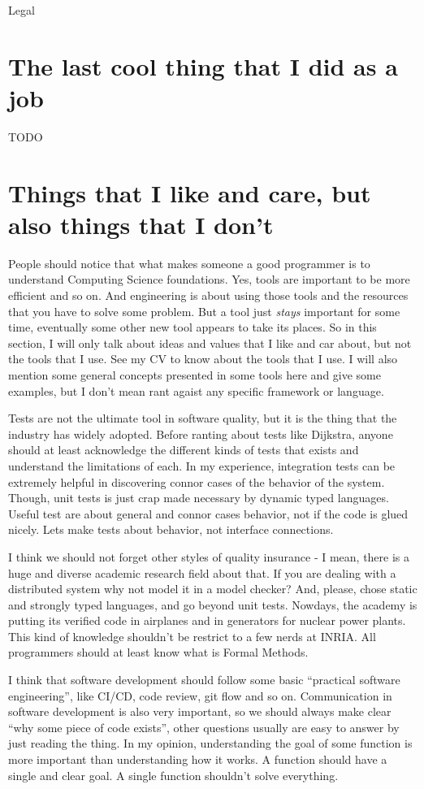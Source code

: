 \documentclass[11pt,a4paper,sans]{moderncv}
\begin{document}
Legal

\section{The last cool thing that I did as a job}
TODO

\section{Things that I like and care, but also things that I don't}
People should notice that what makes someone a good programmer is to understand Computing Science foundations.
Yes, tools are important to be more efficient and
so on. And engineering is about using those tools and the resources that you
have to solve some problem. But a tool just \textit{stays} important for some
time, eventually some other new tool appears to take its places. So in this
section, I will only talk about ideas and values that I like and car about, but
not the tools that I use. See my CV to know about the tools that I use. I will
also mention some general concepts presented in some tools here and give some
examples, but I don't mean rant agaist any specific framework or language.

Tests are not the ultimate tool in software
quality, but it is the thing that the industry has widely adopted.
Before ranting about tests like Dijkstra, anyone should at least acknowledge
the different kinds of tests that exists and understand the limitations of each.
In my experience, integration tests can be extremely helpful in discovering
connor cases of the behavior of the system. Though, unit tests is just crap
made necessary by dynamic typed languages. Useful test are about general
and connor cases behavior, not if the code is glued nicely. Lets make tests
about behavior, not interface connections.

I think we should not forget other styles of quality insurance - I mean, there
is a huge and diverse academic research field about that. If you are dealing
with a distributed system why not model it in a model checker? And, please,
chose static and strongly typed languages, and go beyond unit tests. Nowdays,
the academy is putting its verified code in airplanes and in generators for
nuclear power plants. This kind of knowledge shouldn't be restrict to a few nerds
at INRIA. All programmers should at least know what is Formal Methods.

I think that software development should follow some basic ``practical
software engineering'', like CI/CD, code review, git flow and so on.
Communication in software development is also very important, so we should
always make clear ``why some piece of code exists'', other questions
usually are easy to answer by just reading the thing. In my opinion,
understanding the goal of some function is more important than
understanding how it works. A function should have a single and clear
goal. A single function shouldn't solve everything.
\end{document}
